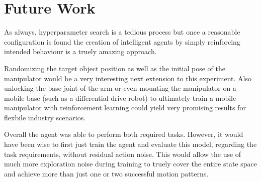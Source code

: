 \documentclass[10pt,journal,compsoc]{IEEEtran}
\begin{document}

\section{Future Work}  

As always, hyperparameter search is a tedious process but once a reasonable configuration is found the creation of intelligent agents by simply reinforcing intended behaviour is a truely amazing approach.

Randomizing the target object position as well as the initial pose of the manipulator would be a very interesting next extension to this experiment. Also unlocking the base-joint of the arm or even mounting the manipulator on a mobile base (such as a differential drive robot) to ultimately train a mobile manipulator with reinforcement learning could yield very promising results for flexbile industry scenarios.

Overall the agent was able to perform both required tasks. However, it would have been wise to first just train the agent and evaluate this model, regarding the task requirements, without residual action noise. This would allow the use of much more exploration noise during training to truely cover the entire state space and achieve more than just one or two successful motion patterns.




% 
%
\end{document}
